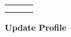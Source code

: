 \begin{table}[H]
\begin{tabular}{|l|l|l|}
                                       &                                                                                                                                                                                                                      &                                                                                                                              \\
                                       &                                                                                                                                                                                                                      &                                                                                                                              \\ \hline
    \end{tabular}
\end{table}

\pagebreak


\textbf{ Update Profile}

